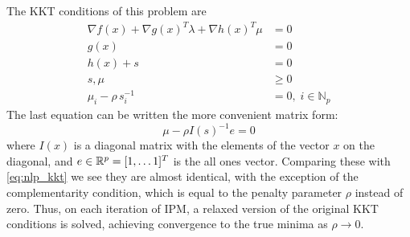 \documentclass[../root.tex]{subfiles}
\begin{document}
    The KKT conditions of this problem are 
    \begin{subequations}
        \begin{align}
            \nabla f(x) + \nabla g(x)^T \lambda + \nabla h(x)^T \mu &= 0\\
            g(x) &= 0 \\
            h(x) + s &= 0 \\
            s, \mu &\geq 0 \\
            \mu_i - \rho \, s_i^{-1} &= 0, \; i \in \mathbb{N}_p 
        \end{align}
    \end{subequations}
    The last equation can be written the more convenient matrix form:
    \begin{equation} \label{eq:ipm_complementarity}
        \mu - \rho I(s)^{-1} e = 0
    \end{equation}
    where $I(x)$ is a diagonal matrix with the elements of the vector $x$ on the
    diagonal, and $e \in \mathbb{R}^p = [1, \dots 1]^T$ is the all ones vector. Comparing
    these with \eqref{eq:nlp_kkt} we see they are almost identical, with the exception
    of the complementarity condition, which is equal to the penalty parameter
    $\rho$ instead of zero. Thus, on each iteration of IPM, a relaxed version of
    the original KKT conditions is solved, achieving convergence to the true
    minima as $\rho \rightarrow 0$.
\end{document}

